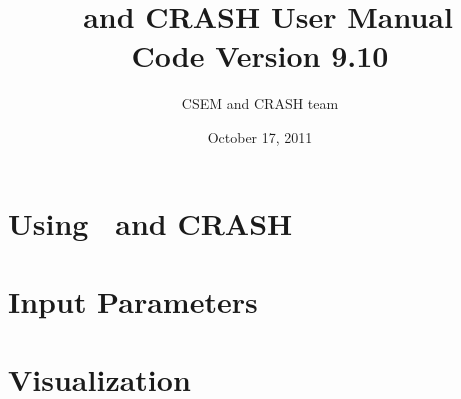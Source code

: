\documentclass[twoside,10pt]{book}
\title{\BATSRUS\ and CRASH User Manual \\ \large Code Version 9.10}
\author{CSEM and CRASH team}
\date{October 17, 2011}
\begin{document}
\pagestyle{headings}

\maketitle

\tableofcontents



\chapter{Using \BATSRUS\ and CRASH \label{chapter:usage}}





\chapter{Input Parameters \label{chapter:param}}






\chapter{Visualization \label{chapter:visualization}}





%
\end{document}

